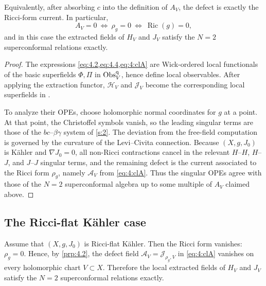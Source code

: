 \documentclass[final,reqno]{amsart}
\numberwithin{equation}{section}
\theoremstyle{definition}
\newtheorem{prp}[thm]{Proposition}
\newcommand{\clA}{\mathcal{A}}
\newcommand{\clH}{\mathcal{H}}
\newcommand{\clJ}{\mathcal{J}}
\newcommand{\qObs}[1]{\mathop{\Obs^{\textup{q}}_{#1}}}
\DeclareMathOperator{\Ric}{Ric}
\DeclareMathOperator{\Obs}{Obs}
\begin{document}

Equivalently, after absorbing $c$ into the definition of $A_V$, 
the defect is exactly the Ricci-form current. 
In particular,
\[
 A_V=0 \ \iff \ \rho_g=0 \ \iff \  \Ric(g)=0,
\]
and in this case the extracted fields of $H_V$ and $J_V$ satisfy 
the $N=2$ superconformal relations exactly.

\begin{proof}
The expressions \cref{eq:4.2,eq:4.4,eq:4:clA} are Wick-ordered 
local functionals of the basic superfields $\Phi,\Pi$ in $\qObs{V}$, 
hence define local observables.
After applying the extraction functor, $\clH_V$ and $\clJ_V$ become 
the corresponding local superfields in \cite[\S7]{BHS}.

To analyze their OPEs, choose holomorphic normal coordinates for $g$ at a point.
At that point, the Christoffel symbols vanish, 
so the leading singular terms are those of 
the $bc$--$\beta\gamma$ system of \cref{s:2}. 
The deviation from the free-field computation is governed by 
the curvature of the Levi--Civita connection. 
Because $(X,g,J_0)$ is K\"ahler and $\nabla J_0=0$, 
all non-Ricci contractions cancel in the relevant
$H$--$H$, $H$--$J$, and $J$--$J$ singular terms, 
and the remaining defect is the current associated to the Ricci form $\rho_g$,
namely $\clA_V$ from \cref{eq:4:clA}. 
Thus the singular OPEs agree with those of 
the $N=2$ superconformal algebra up to some multiple of $A_V$ claimed above.
\end{proof}


\subsection{The Ricci-flat K\"ahler case}\label{ss:4.3}

Assume that $(X,g,J_0)$ is Ricci-flat K\"ahler. 
Then the Ricci form vanishes: $\rho_g=0$.
Hence, by \cref{prp:4.2}, the defect field $\clA_V = \clJ_{\rho_g,V}$ 
in \eqref{eq:4:clA} vanishes on every holomorphic chart $V \subset X$. 
Therefore the local extracted fields of $H_V$ and $J_V$ 
satisfy the $N=2$ superconformal relations exactly.
\end{document}
